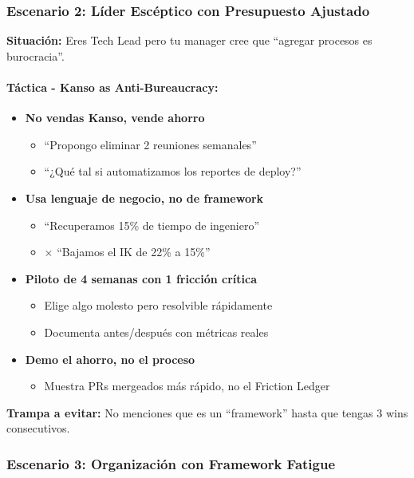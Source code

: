 \subsubsection*{Escenario 2: Líder Escéptico con Presupuesto Ajustado}

\textbf{Situación:} Eres Tech Lead pero tu manager cree que ``agregar procesos es burocracia''.

\paragraph{Táctica - Kanso as Anti-Bureaucracy:}

\begin{itemize}
    \item \textbf{No vendas Kanso, vende ahorro}
    \begin{itemize}
        \item ``Propongo eliminar 2 reuniones semanales''
        \item ``¿Qué tal si automatizamos los reportes de deploy?''
    \end{itemize}
    \item \textbf{Usa lenguaje de negocio, no de framework}
    \begin{itemize}
        \item ``Recuperamos 15\% de tiempo de ingeniero''
        \item $\times$ ``Bajamos el IK de 22\% a 15\%''
    \end{itemize}
    \item \textbf{Piloto de 4 semanas con 1 fricción crítica}
    \begin{itemize}
        \item Elige algo molesto pero resolvible rápidamente
        \item Documenta antes/después con métricas reales
    \end{itemize}
    \item \textbf{Demo el ahorro, no el proceso}
    \begin{itemize}
        \item Muestra PRs mergeados más rápido, no el Friction Ledger
    \end{itemize}
\end{itemize}
\textbf{Trampa a evitar:}
No menciones que es un ``framework'' hasta que tengas 3 wins consecutivos.

\subsubsection*{Escenario 3: Organización con Framework Fatigue}

